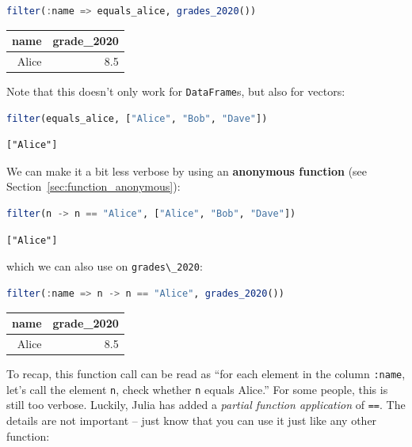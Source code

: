\documentclass[
  notoc %
]{tufte-book}
\newcommand{\passthrough}[1]{#1}
\begin{document}
\begin{lstlisting}[language=Julia]
filter(:name => equals_alice, grades_2020())
\end{lstlisting}

\begin{longtable}[]{@{}rr@{}}
\toprule
name & grade\_2020 \\
\midrule
\endhead
Alice & 8.5 \\
\bottomrule
\end{longtable}

Note that this doesn't only work for
\passthrough{\lstinline!DataFrame!}s, but also for vectors:

\begin{lstlisting}[language=Julia]
filter(equals_alice, ["Alice", "Bob", "Dave"])
\end{lstlisting}

\begin{lstlisting}[language=Output]
["Alice"]
\end{lstlisting}

We can make it a bit less verbose by using an \textbf{anonymous
function} (see Section~\ref{sec:function_anonymous}):

\begin{lstlisting}[language=Julia]
filter(n -> n == "Alice", ["Alice", "Bob", "Dave"])
\end{lstlisting}

\begin{lstlisting}[language=Output]
["Alice"]
\end{lstlisting}

which we can also use on \passthrough{\lstinline!grades\_2020!}:

\begin{lstlisting}[language=Julia]
filter(:name => n -> n == "Alice", grades_2020())
\end{lstlisting}

\begin{longtable}[]{@{}rr@{}}
\toprule
name & grade\_2020 \\
\midrule
\endhead
Alice & 8.5 \\
\bottomrule
\end{longtable}

To recap, this function call can be read as ``for each element in the
column \passthrough{\lstinline!:name!}, let's call the element
\passthrough{\lstinline!n!}, check whether \passthrough{\lstinline!n!}
equals Alice.'' For some people, this is still too verbose. Luckily,
Julia has added a \emph{partial function application} of
\passthrough{\lstinline!==!}. The details are not important -- just know
that you can use it just like any other function:
\end{document}

